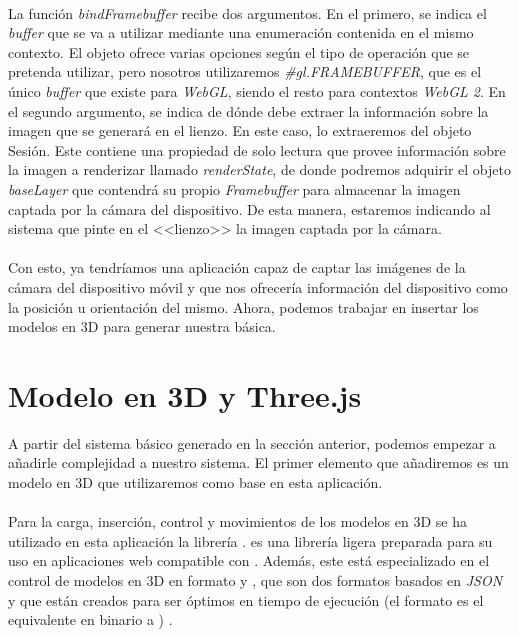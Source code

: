 \documentclass{subfiles}
\begin{document}
        \paragraph{}
        La función \textit{bindFramebuffer} recibe dos argumentos. En el primero, se indica el \textit{buffer} que se va a utilizar mediante una enumeración contenida en el mismo contexto. El objeto ofrece varias opciones según el tipo de operación que se pretenda utilizar, pero nosotros utilizaremos \textit{\#gl.FRAMEBUFFER}, que es el único \textit{buffer} que existe para \textit{WebGL}, siendo el resto para contextos \textit{WebGL 2}. En el segundo argumento, se indica de dónde debe extraer la información sobre la imagen que se generará en el lienzo. En este caso, lo extraeremos del objeto Sesión. Este contiene una propiedad de solo lectura que provee información sobre la imagen a renderizar llamado \textit{renderState}, de donde podremos adquirir el objeto \textit{baseLayer} que contendrá su propio \textit{Framebuffer} para almacenar la imagen captada por la cámara del dispositivo. De esta manera, estaremos indicando al sistema que pinte en el <<lienzo>> la imagen captada por la cámara.

        \paragraph{}
        Con esto, ya tendríamos una aplicación capaz de captar las imágenes de la cámara del dispositivo móvil y que nos ofrecería información del dispositivo como la posición u orientación del mismo. Ahora, podemos trabajar en insertar los modelos en 3D para generar nuestra \ra básica.

        \section{Modelo en 3D y Three.js}
        \label{sec:modelo_en_3d_y_three_js}
        A partir del sistema básico generado en la sección anterior, podemos empezar a añadirle complejidad a nuestro sistema. El primer elemento que añadiremos es un modelo en 3D que utilizaremos como base en esta aplicación.

        \paragraph{}
        Para la carga, inserción, control y movimientos de los modelos en 3D se ha utilizado en esta aplicación la librería \threejs. \threejs es una librería ligera preparada para su uso en aplicaciones web compatible con \js \cite{web:wikipediathreejs}. Además, este está especializado en el control de modelos en 3D en formato \glb y \gltf, que son dos formatos basados en \textit{JSON} y que están creados para ser óptimos en tiempo de ejecución (el formato \glb es el equivalente en binario a \gltf) \cite{web:threejs_loading3dmodels}.
\end{document}
